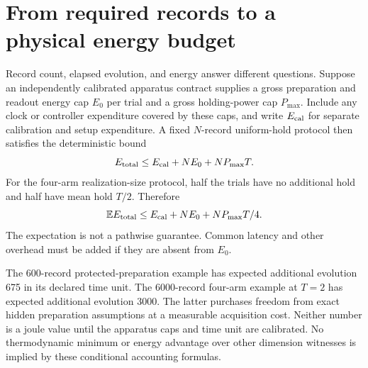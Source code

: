 \section{From required records to a physical energy budget}
Record count, elapsed evolution, and energy answer different questions. Suppose
an independently calibrated apparatus contract supplies a gross preparation
and readout energy cap $E_0$ per trial and a gross holding-power cap $P_{\max}$.
Include any clock or controller expenditure covered by these caps, and write
$E_{\rm cal}$ for separate calibration and setup expenditure. A fixed $N$-record
uniform-hold protocol then satisfies the deterministic bound
\[
 E_{\rm total}\leq E_{\rm cal}+NE_0+NP_{\max}T.
\]
For the four-arm realization-size protocol, half the trials have no additional
hold and half have mean hold $T/2$. Therefore
\[
 \mathbb E E_{\rm total}
 \leq E_{\rm cal}+NE_0+NP_{\max}T/4.
\]
The expectation is not a pathwise guarantee. Common latency and other overhead
must be added if they are absent from $E_0$.

The 600-record protected-preparation example has expected additional evolution
675 in its declared time unit. The 6000-record four-arm example at $T=2$ has
expected additional evolution 3000. The latter purchases freedom from exact
hidden preparation assumptions at a measurable acquisition cost. Neither
number is a joule value until the apparatus caps and time unit are calibrated.
No thermodynamic minimum or energy advantage over other dimension witnesses
is implied by these conditional accounting formulas.
